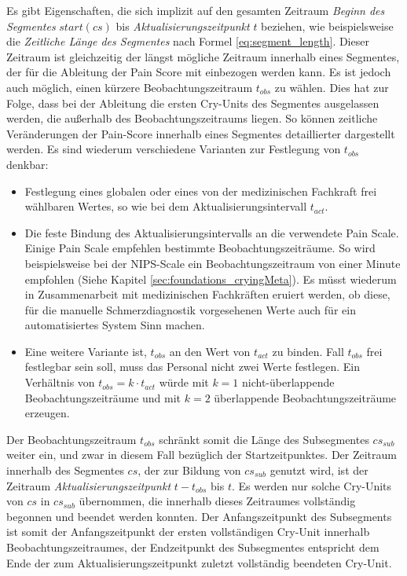 Es gibt Eigenschaften, die sich implizit auf den gesamten Zeitraum \emph{Beginn des Segmentes} $start(cs)$ bis \emph{Aktualisierungszeitpunkt} $t$ beziehen, wie beispielsweise die \emph{Zeitliche Länge des Segmentes} nach Formel \ref{eq:segment_length}. Dieser Zeitraum ist gleichzeitig der längst mögliche Zeitraum innerhalb eines Segmentes, der für die Ableitung der Pain Score mit einbezogen werden kann. Es ist jedoch auch möglich, einen kürzere Beobachtungszeitraum $t_{obs}$ zu wählen. Dies hat zur Folge, dass bei der Ableitung die ersten Cry-Units des Segmentes ausgelassen werden, die außerhalb des Beobachtungszeitraums liegen. So können zeitliche Veränderungen der Pain-Score innerhalb eines Segmentes detaillierter dargestellt werden. Es sind wiederum verschiedene Varianten zur Festlegung von $t_{obs}$ denkbar:
\begin{itemize}
\item Festlegung eines globalen oder eines von der medizinischen Fachkraft frei wählbaren Wertes, so wie bei dem Aktualisierungsintervall $t_{act}$.
\item Die feste Bindung des Aktualisierungsintervalls an die verwendete Pain Scale. Einige Pain Scale empfehlen bestimmte Beobachtungszeiträume. So wird beispielsweise bei der NIPS-Scale ein Beobachtungszeitraum von einer Minute empfohlen (Siehe Kapitel \ref{sec:foundations_cryingMeta}). Es müsst wiederum in Zusammenarbeit mit medizinischen Fachkräften eruiert werden, ob diese, für die manuelle Schmerzdiagnostik vorgesehenen Werte auch für ein automatisiertes System Sinn machen.
\item Eine weitere Variante ist, $t_{obs}$ an den Wert von $t_{act}$ zu binden. Fall $t_{obs}$ frei festlegbar sein soll, muss das Personal nicht zwei Werte festlegen. Ein Verhältnis von $t_{obs} = k \cdot t_{act}$ würde mit $k=1$ nicht-überlappende Beobachtungszeiträume und  mit $k=2$ überlappende Beobachtungszeiträume erzeugen.
\end{itemize}

Der Beobachtungszeitraum $t_{obs}$ schränkt somit die Länge des Subsegmentes $cs_{sub}$ weiter ein, und zwar in diesem Fall bezüglich der Startzeitpunktes. Der Zeitraum innerhalb des Segmentes $cs$, der zur Bildung von $cs_{sub}$ genutzt wird, ist der Zeitraum \emph{Aktualisierungszeitpunkt} $t - t_{obs}$ bis $t$. Es werden nur solche Cry-Units von $cs$ in $cs_{sub}$ übernommen, die innerhalb dieses Zeitraumes vollständig begonnen und beendet werden konnten. Der Anfangszeitpunkt des Subsegments ist somit der Anfangszeitpunkt der ersten vollständigen Cry-Unit innerhalb  Beobachtungszeitraumes, der Endzeitpunkt des Subsegmentes entspricht dem Ende der zum Aktualisierungszeitpunkt zuletzt vollständig beendeten Cry-Unit.

